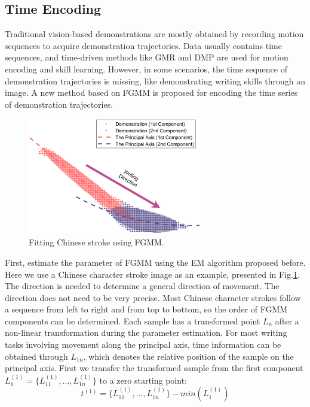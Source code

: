 \documentclass[journal]{IEEEtran}
\begin{document}
\subsection{Time Encoding}
Traditional vision-based demonstrations are mostly obtained by recording motion sequences to acquire demonstration trajectories. Data usually contains time sequences, and time-driven methods like GMR and DMP are used for motion encoding and skill learning. However, in some scenarios, the time sequence of demonstration trajectories is missing, like demonstrating writing skills through an image. A new method based on FGMM is proposed for encoding the time series of demonstration trajectories.
\begin{figure}[!t]
    \centering
    \includegraphics[width=3in]{./fig/fig3.pdf}
    \caption{Fitting Chinese stroke using FGMM.}
    \label{fig3}
\end{figure}

First, estimate the parameter of FGMM using the EM algorithm proposed before. Here we use a Chinese character stroke image as an example, presented in Fig.\ref{fig3}. The direction is needed to determine a general direction of movement. The direction does not need to be very precise. Most Chinese character strokes follow a sequence from left to right and from top to bottom, so the order of FGMM components can be determined. Each sample has a transformed point $L_n$ after a non-linear transformation during the parameter estimation. For most writing tasks involving movement along the principal axis, time information can be obtained through $L_{1n}$, which denotes the relative position of the sample on the principal axis. First we transfer the transformed sample from the first component $L_{1}^{(1)}=\{L_{11}^{(1)}, \hdots, L_{1n}^{(1)}\}$ to a zero starting point:
\begin{equation}
    t^{(1)}=\{L_{11}^{(1)}, \hdots, L_{1n}^{(1)}\}-min(L_{1}^{(1)})
\end{equation}
\end{document}
